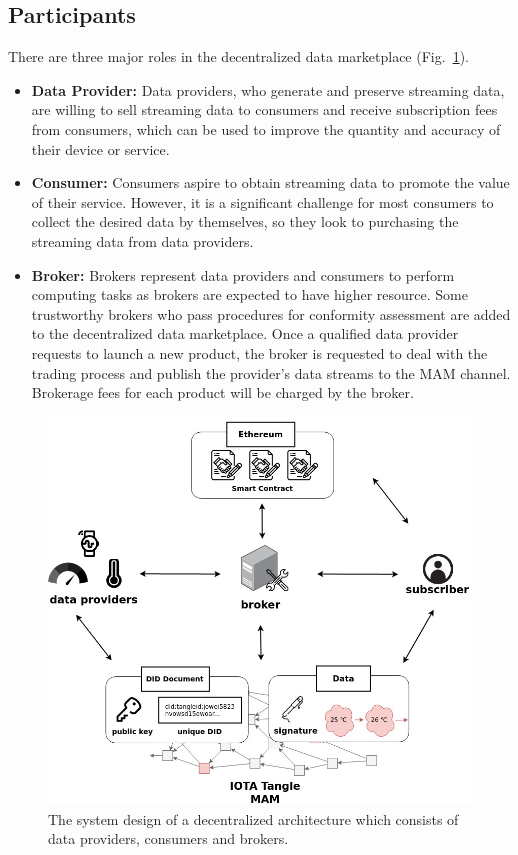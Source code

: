 \documentclass[conference]{IEEEtran}
\begin{document}
\subsection{Participants}
There are three major roles in the decentralized data marketplace (Fig.~\ref{fig:system_design}).

\begin{itemize}
\item \textbf{Data Provider: }
Data providers, who generate and preserve streaming data, are willing to sell streaming data to consumers and receive subscription fees from consumers, which can be used to improve the quantity and accuracy of their device or service.
\item \textbf{Consumer: }
Consumers aspire to obtain streaming data to promote the value of their service. However, it is a significant challenge for most consumers to collect the desired data by themselves, so they look to purchasing the streaming data from data providers.
\item \textbf{Broker: }
Brokers represent data providers and consumers to perform computing tasks as brokers are expected to have higher resource. Some trustworthy brokers who pass procedures for conformity assessment are added to the decentralized data marketplace. Once a qualified data provider requests to launch a new product, the broker is requested to deal with the trading process and publish the provider’s data streams to the MAM channel. Brokerage fees for each product will be charged by the broker.
\end{itemize}

\begin{figure}[!t]
    \centering
    \includegraphics[width=3.in]{system_design}
    \caption{The system design of a decentralized architecture which consists of data providers, consumers and brokers.}
    \label{fig:system_design}
\end{figure}
\end{document}
